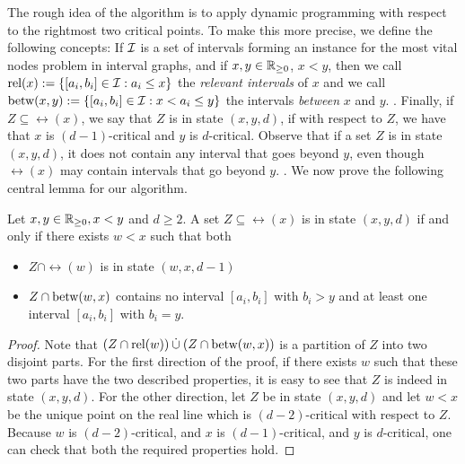 The rough idea of the algorithm is to apply dynamic programming with respect to the rightmost two critical points. To make this more precise, we define the following concepts: If $\mathcal{I}$ is a set of intervals forming an instance for the most vital nodes problem in interval graphs, and if $x, y \in \mathbb{R}_{\geq 0}$, $x < y$, then we call $\operatorname{\text{rel}}(x) := \{ [a_i, b_i] \in \mathcal{I} : a_i \leq x \}$ the \emph{relevant intervals} of $x$ and we call $\operatorname{\text{betw}}(x, y) := \{ [a_i, b_i] \in \mathcal{I} : x < a_i \leq y \}$ the intervals \emph{between} $x$ and $y$. 
. 
Finally, if $Z \subseteq \rel(x)$, we say that $Z$ is in state $(x, y, d)$, if with respect to $Z$, we have that $x$ is $(d-1)$-critical and $y$ is $d$-critical. 
Observe that if a set $Z$ is in state $(x, y, d)$, it does not contain any interval that goes beyond $y$, even though $\rel(x)$ may contain intervals that go beyond $y$. 
. We now prove the following central lemma for our algorithm.

\begin{lemma}
\label{lemma:shortest_path_bellmann_principle}
Let $x, y \in \mathbb{R}_{\geq 0}, x < y$ and $d \geq 2$. A set $Z \subseteq \rel(x)$ is in state $(x, y, d)$ if and only if there exists $w < x$ such that both 
\begin{itemize}
\item $Z \cap \rel(w)$ is in state $(w, x, d-1)$
\item $Z \cap \operatorname{\text{betw}}(w, x)$ contains no interval $[a_i, b_i]$ with $b_i > y$ and at least one interval $[a_i, b_i]$ with $b_i = y$.
\end{itemize} 
\end{lemma}
\begin{proof}
Note that $(Z \cap \operatorname{\text{rel}}(w)) \mathbin{\dot{\cup}} (Z \cap \operatorname{\text{betw}}(w, x))$ is a partition of $Z$ into two disjoint parts. For the first direction of the proof, if there exists $w$ such that these two parts have the two described properties, it is easy to see that $Z$ is indeed in state $(x, y, d)$. For the other direction, let $Z$ be in state $(x, y, d)$ and let $w < x$ be the unique point on the real line which is $(d-2)$-critical with respect to $Z$. Because $w$ is $(d-2)$-critical, and $x$ is $(d-1)$-critical, and $y$ is $d$-critical, one can check that both the required properties hold.
\end{proof}


